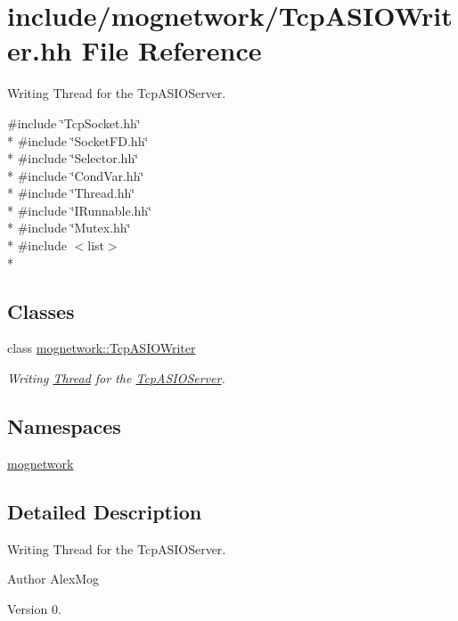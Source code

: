 \hypertarget{_tcp_a_s_i_o_writer_8hh}{\section{include/mognetwork/\-Tcp\-A\-S\-I\-O\-Writer.hh File Reference}
\label{_tcp_a_s_i_o_writer_8hh}
}


Writing Thread for the Tcp\-A\-S\-I\-O\-Server.  


{\ttfamily \#include \char`\"{}Tcp\-Socket.\-hh\char`\"{}}\\*
{\ttfamily \#include \char`\"{}Socket\-F\-D.\-hh\char`\"{}}\\*
{\ttfamily \#include \char`\"{}Selector.\-hh\char`\"{}}\\*
{\ttfamily \#include \char`\"{}Cond\-Var.\-hh\char`\"{}}\\*
{\ttfamily \#include \char`\"{}Thread.\-hh\char`\"{}}\\*
{\ttfamily \#include \char`\"{}I\-Runnable.\-hh\char`\"{}}\\*
{\ttfamily \#include \char`\"{}Mutex.\-hh\char`\"{}}\\*
{\ttfamily \#include $<$list$>$}\\*
\subsection*{Classes}
\begin{DoxyCompactItemize}
\item 
class \hyperlink{classmognetwork_1_1_tcp_a_s_i_o_writer}{mognetwork\-::\-Tcp\-A\-S\-I\-O\-Writer}
\begin{DoxyCompactList}\small\item\em Writing \hyperlink{classmognetwork_1_1_thread}{Thread} for the \hyperlink{classmognetwork_1_1_tcp_a_s_i_o_server}{Tcp\-A\-S\-I\-O\-Server}. \end{DoxyCompactList}\end{DoxyCompactItemize}
\subsection*{Namespaces}
\begin{DoxyCompactItemize}
\item 
\hyperlink{namespacemognetwork}{mognetwork}
\end{DoxyCompactItemize}


\subsection{Detailed Description}
Writing Thread for the Tcp\-A\-S\-I\-O\-Server. \begin{DoxyAuthor}{Author}
Alex\-Mog 
\end{DoxyAuthor}
\begin{DoxyVersion}{Version}
0. 
\end{DoxyVersion}
